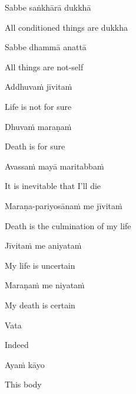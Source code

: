 Sabbe saṅkhārā dukkhā

\begin{english}
  All conditioned things are dukkha
\end{english}

Sabbe dhammā anattā

\begin{english}
  All things are not-self\makeatletter\hyperlink{endnote104-appendix}\makeatother
\end{english}

\suttaRef{[Dhp 277-279]}

Addhuvaṁ jīvitaṁ

\begin{english}
  Life is not for sure
\end{english}

Dhuvaṁ maraṇaṁ

\begin{english}
  Death is for sure
\end{english}

Avassaṁ mayā maritabbaṁ

\begin{english}
  It is inevitable that I'll die
\end{english}

Maraṇa-pariyosānaṁ me jīvitaṁ

\begin{english}
  Death is the culmination of my life
\end{english}

Jīvitaṁ me aniyataṁ

\begin{english}
  My life is uncertain
\end{english}

Maraṇaṁ me niyataṁ

\begin{english}
  My death is certain
\end{english}

\suttaRef{[Dhp A]}

\clearpage

Vata

\begin{english}
  Indeed
\end{english}

Ayaṁ kāyo

\begin{english}
  This body
\end{english}

